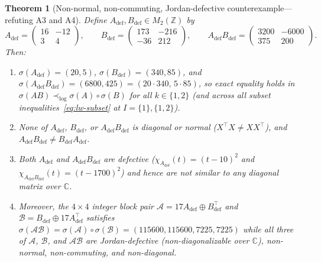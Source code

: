 \documentclass[11pt,a4paper]{article}
\newtheorem{theorem}{Theorem}[section]
\theoremstyle{definition}
\newcommand{\C}{\mathbb{C}}
\newcommand{\Z}{\mathbb{Z}}
\begin{document}
\begin{theorem}[Non-normal, non-commuting, Jordan-defective counterexample---refuting A3 and A4]\label{thm:defective-cex}
Define $A_{\mathrm{def}}, B_{\mathrm{def}} \in M_2(\Z)$ by
\[
  A_{\mathrm{def}} = \begin{pmatrix} 16 & -12 \\ 3 & 4 \end{pmatrix},
  \qquad
  B_{\mathrm{def}} = \begin{pmatrix} 173 & -216 \\ -36 & 212 \end{pmatrix},
  \qquad
  A_{\mathrm{def}} B_{\mathrm{def}} = \begin{pmatrix} 3200 & -6000 \\ 375 & 200 \end{pmatrix}.
\]
Then:
\begin{enumerate}
  \item[(a)] $\sigma(A_{\mathrm{def}}) = (20, 5)$, $\sigma(B_{\mathrm{def}}) = (340, 85)$, and $\sigma(A_{\mathrm{def}} B_{\mathrm{def}}) = (6800, 425) = (20\cdot 340,\, 5\cdot 85)$, so exact equality holds in $\sigma(AB) \prec_{\log} \sigma(A)\circ\sigma(B)$ for all $k \in \{1, 2\}$ (and across all subset inequalities~\eqref{eq:lw-subset} at $I = \{1\}, \{1, 2\}$).
  \item[(b)] None of $A_{\mathrm{def}}$, $B_{\mathrm{def}}$, or $A_{\mathrm{def}} B_{\mathrm{def}}$ is diagonal or normal ($X^\top X \ne X X^\top$), and $A_{\mathrm{def}} B_{\mathrm{def}} \ne B_{\mathrm{def}} A_{\mathrm{def}}$.
  \item[(c)] Both $A_{\mathrm{def}}$ and $A_{\mathrm{def}} B_{\mathrm{def}}$ are defective ($\chi_{A_{\mathrm{def}}}(t) = (t - 10)^2$ and $\chi_{A_{\mathrm{def}} B_{\mathrm{def}}}(t) = (t - 1700)^2$) and hence are not similar to any diagonal matrix over $\C$.
  \item[(d)] Moreover, the $4\times 4$ integer block pair $\mathcal{A} = 17 A_{\mathrm{def}} \oplus B_{\mathrm{def}}^\top$ and $\mathcal{B} = B_{\mathrm{def}} \oplus 17 A_{\mathrm{def}}^\top$ satisfies $\sigma(\mathcal{A}\mathcal{B}) = \sigma(\mathcal{A})\circ\sigma(\mathcal{B}) = (115600, 115600, 7225, 7225)$ while \emph{all three} of $\mathcal{A}$, $\mathcal{B}$, and $\mathcal{A}\mathcal{B}$ are Jordan-defective (non-diagonalizable over $\C$), non-normal, non-commuting, and non-diagonal.
\end{enumerate}
\end{theorem}
\end{document}
